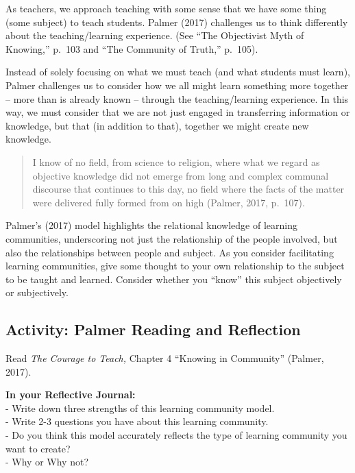 \documentclass[
]{book}
\begin{document}
As teachers, we approach teaching with some sense that we have some thing (some subject) to teach students. Palmer (2017) challenges us to think differently about the teaching/learning experience. (See ``The Objectivist Myth of Knowing,'' p.~103 and ``The Community of Truth,'' p.~105).

Instead of solely focusing on what we must teach (and what students must learn), Palmer challenges us to consider how we all might learn something more together -- more than is already known -- through the teaching/learning experience. In this way, we must consider that we are not just engaged in transferring information or knowledge, but that (in addition to that), together we might create new knowledge.

\begin{quote}
I know of no field, from science to religion, where what we regard as objective knowledge did not emerge from long and complex communal discourse that continues to this day, no field where the facts of the matter were delivered fully formed from on high (Palmer, 2017, p.~107).
\end{quote}

Palmer's (2017) model highlights the relational knowledge of learning communities, underscoring not just the relationship of the people involved, but also the relationships between people and subject. As you consider facilitating learning communities, give some thought to your own relationship to the subject to be taught and learned. Consider whether you ``know'' this subject objectively or subjectively.

\hypertarget{activity-palmer-reading-and-reflection}{%
\subsection*{Activity: Palmer Reading and Reflection}\label{activity-palmer-reading-and-reflection}}

\begin{reflect}
Read \emph{The Courage to Teach,} Chapter 4 ``Knowing in Community''
(Palmer, 2017).

\textbf{In your Reflective Journal:}\\
- Write down three strengths of this learning community model.\\
- Write 2-3 questions you have about this learning community.\\
- Do you think this model accurately reflects the type of learning
community you want to create?\\
- Why or Why not?
\end{reflect}
\end{document}
